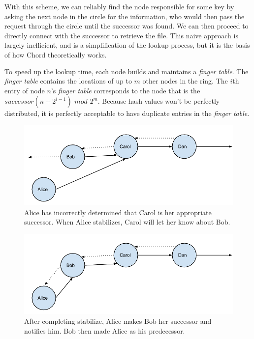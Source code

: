\documentclass[conference, compsocconf, letterpaper]{IEEEtran}
\begin{document}
With this scheme, we can reliably find the node responsible for some key by asking the next node in the circle for the information, who would then pass the request through the circle until the successor was found.  We can then proceed to directly connect with the successor to retrieve the file.  This naive approach is largely inefficient, and is a simplification of the lookup process, but it is the basis of how Chord theoretically works.

To speed up the lookup time, each node builds and maintains a \emph{finger table}.  The \emph{finger table} contains the locations of up to $m$ other nodes in the ring.  The $i$th entry of node $n$'s \emph{finger table} corresponds to the node that is the $successor(n+2^{i-1})$ $mod$ $2^m$. Because hash values won't be perfectly distributed, it is perfectly acceptable to have duplicate entries in the \emph{finger table}. 


\begin{figure}
    \includegraphics[width=\linewidth]{abcd1}
    \caption{Alice has incorrectly determined that Carol is her appropriate successor.  When Alice stabilizes, Carol will let her know about Bob.}
    \label{abcd1}
\end{figure}


\begin{figure}
    \includegraphics[width=\linewidth]{abcd2}
    \caption{After completing stabilize, Alice makes Bob her successor and notifies him. Bob then made Alice as his predecessor.}
    \label{abcd2}
\end{figure}
\end{document}
